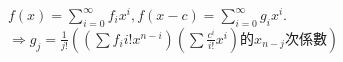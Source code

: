 $f(x)=\sum_{i=0}^\infty f_ix^i, f(x-c)=\sum_{i=0}^\infty g_ix^i$.\\
$\Rightarrow g_j=\frac1{j!}\left((\sum f_ii!x^{n-i})(\sum\frac{c^i}{i!}x^i)\text{的}x_{n-j}\text{次係數}\right)$
